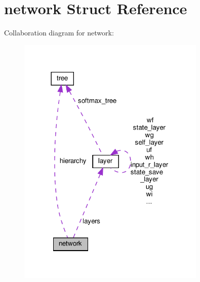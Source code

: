 \hypertarget{structnetwork}{}\section{network Struct Reference}
\label{structnetwork}


Collaboration diagram for network\+:
\nopagebreak
\begin{figure}[H]
\begin{center}
\leavevmode
\includegraphics[width=254pt]{structnetwork__coll__graph}
\end{center}
\end{figure}
